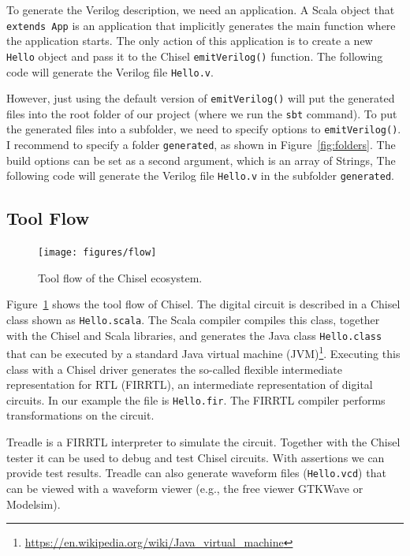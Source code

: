 \documentclass[%
    10pt,
    headinclude, footexclude,
    openright, %
    notitlepage,
    cleardoubleempty,
    headsepline,
    pointlessnumbers,
    bibtotoc, idxtotoc,
    ]{scrbook}
\newcommand{\code}[1]{{\small{\texttt{#1}}}}
\newcommand{\myref}[2]{\href{#1}{#2}}
\renewcommand{\myref}[2]{{#2}{\footnote{\url{#1}}}}
\begin{document}
To generate the Verilog description, we need an application. A Scala object that \code{extends App}
is an application that implicitly generates the main function where the application starts.
The only action of this application is to create a new \code{Hello} object and pass it
to the Chisel \code{emitVerilog()} function.
The following code will generate the Verilog file \code{Hello.v}.


However, just using the default version of \code{emitVerilog()} will put the generated files
into the root folder of our project (where we run the \code{sbt} command).
To put the generated files into a subfolder, we need to specify options to \code{emitVerilog()}.
I recommend to specify a folder \code{generated}, as shown in Figure~\ref{fig:folders}.
The build options can be set as a second argument, which is an array of Strings,
The following code will generate the Verilog file \code{Hello.v} in the subfolder \code{generated}. 


\subsection{Tool Flow}

\begin{figure}
  \centering
  \texttt{[image: figures/flow]}
  \caption{Tool flow of the Chisel ecosystem.}
  \label{fig:flow}
\end{figure}

Figure~\ref{fig:flow} shows the tool flow of Chisel. The digital circuit is described in a Chisel class
shown as \code{Hello.scala}. The Scala compiler compiles this class, together with the Chisel and Scala
libraries, and generates the Java class \code{Hello.class} that can be executed by a standard
\myref{https://en.wikipedia.org/wiki/Java_virtual_machine}{Java virtual machine (JVM)}.
Executing this class with a Chisel driver generates the so-called flexible intermediate representation for
RTL (FIRRTL), an intermediate representation of digital circuits. In our example the file is \code{Hello.fir}.
The FIRRTL compiler performs transformations on the circuit.

Treadle is a FIRRTL interpreter to simulate the circuit. Together with the Chisel tester it can be
used to debug and test Chisel circuits. With assertions we can provide test results.
Treadle can also generate waveform files (\code{Hello.vcd}) that can be viewed with
a waveform viewer (e.g., the free viewer GTKWave or Modelsim).
\end{document}
